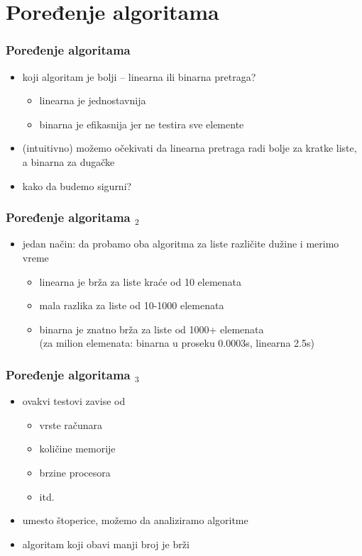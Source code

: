 \documentclass[utf8,compress,aspectratio=169]{beamer}
\begin{document}
\section[Poređenje]{Poređenje algoritama}

\begin{frame}[fragile]
  \frametitle{Poređenje algoritama}
  \begin{itemize}
    \item koji algoritam je bolji -- linearna ili binarna pretraga?
    \begin{itemize}
      \item linearna je jednostavnija
      \item binarna je efikasnija jer ne testira sve elemente
    \end{itemize}
    \item (intuitivno) možemo očekivati da linearna pretraga radi
      bolje za kratke liste, a binarna za dugačke
    \item kako da budemo sigurni?
  \end{itemize}
\end{frame}

\begin{frame}[fragile]
  \frametitle{Poređenje algoritama $_2$}
  \begin{itemize}
    \item jedan način: da probamo oba algoritma za liste različite dužine
       i merimo vreme
    \begin{itemize}
      \item linearna je brža za liste kraće od 10 elemenata
      \item mala razlika za liste od 10-1000 elemenata
      \item binarna je znatno brža za liste od 1000+ elemenata \\
        (za milion elemenata: binarna u proseku 0.0003s, linearna 2.5s)
    \end{itemize}
  \end{itemize}
\end{frame}

\begin{frame}[fragile]
  \frametitle{Poređenje algoritama $_3$}
  \begin{itemize}
    \item ovakvi testovi zavise od
    \begin{itemize}
      \item vrste računara
      \item količine memorije
      \item brzine procesora
      \item itd.
    \end{itemize}
    \item umesto štoperice, možemo da analiziramo algoritme
    \item algoritam koji obavi manji broj  je brži
  \end{itemize}
\end{frame}
\end{document}

